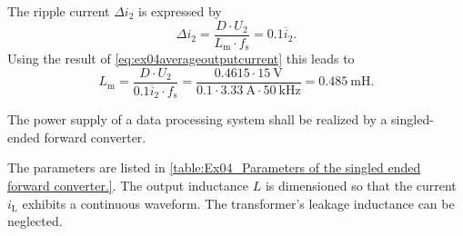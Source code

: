 \begin{solutionblock}
    The ripple current $\Delta i_\mathrm{2}$ is expressed by
    \begin{equation}
        \Delta i_\mathrm{2}= \frac{D \cdot U_\mathrm{2}}{L_\mathrm{m} \cdot f_\mathrm{s}} = 0.1 \overline{i}_\mathrm{2}.
    \end{equation}
    Using the result of \eqref{eq:ex04averageoutputcurrent} this leads to
    \begin{equation}
        L_\mathrm{m}  = \frac{D \cdot U_\mathrm{2}}{0.1 \overline{i}_\mathrm{2} \cdot f_\mathrm{s}} 
        = \frac{0.4615 \cdot \SI{15}{\volt}}{0.1 \cdot \SI{3.33}{\ampere} \cdot \SI{50}{\kilo\hertz}}=\SI{0.485}{\milli\henry}.
    \end{equation}    
\end{solutionblock}





The power supply of a data processing system shall be realized by a singled-ended forward converter.



\FloatBarrier
The parameters are listed in \autoref{table:Ex04_Parameters of the singled ended forward converter.}.
The output inductance $L$ is dimensioned so that the current $i_\mathrm{L}$ exhibits a continuous waveform.
The transformer's leakage inductance can be neglected.

